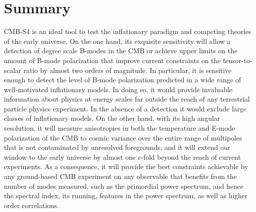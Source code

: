 \section{Summary}
CMB-S4 is an ideal tool to test the inflationary paradigm and competing theories of the early universe. On the one hand, its exquisite sensitivity will allow a detection of degree scale B-modes in the CMB or achieve upper limits on the amount of B-mode polarization that improve current constraints on the tensor-to-scalar ratio by almost two orders of magnitude. In particular, it is sensitive enough to detect the level of B-mode polarization predicted in a wide range of well-motivated inflationary models. In doing so, it would provide invaluable information about physics at energy scales far outside the reach of any terrestrial particle physics experiment. In the absence of a detection it would exclude large classes of inflationary models. On the other hand, with its high angular resolution, it will measure anisotropies in both the temperature and E-mode polarization of the CMB to cosmic variance over the entire range of multipoles that is not contaminated by unresolved foregrounds, and it will extend our window to the early universe by almost one $e$-fold beyond the reach of current experiments. As a consequence, it will provide the best constraints achievable by any ground-based CMB experiment on any observable that benefits from the number of modes measured, such as the primordial power spectrum, and hence the spectral index, its running, features in the power spectrum, as well as higher order correlations.


 
